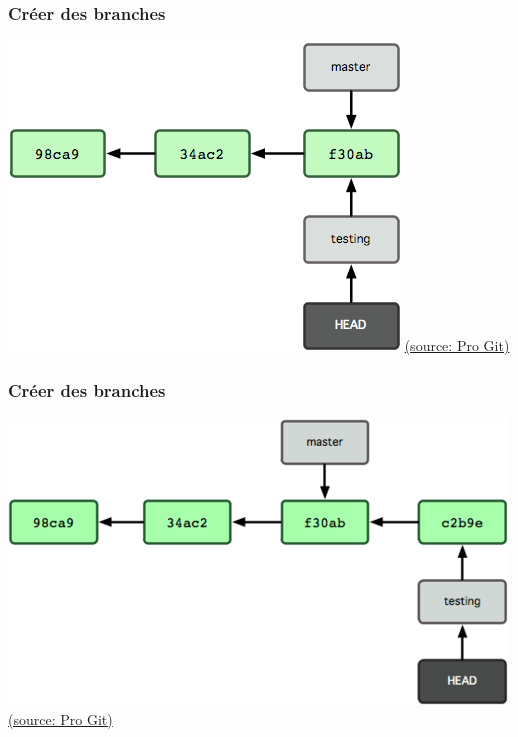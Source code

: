 \documentclass[t,11pt]{beamer}
\begin{document}
\begin{frame}
        \frametitle{Cr\'eer des branches}
        \centering
        \includegraphics[width=\linewidth,height=0.8\textheight,keepaspectratio]{./img/branching_3}
        \newline
        \href{https://git-scm.com/book/fr/v1/Les-branches-avec-Git-Ce-qu-est-une-branche}{{\tiny (source: Pro Git)}}
\end{frame}

\begin{frame}
        \frametitle{Cr\'eer des branches}
        \centering
        \includegraphics[width=\linewidth,height=0.8\textheight,keepaspectratio]{./img/branching_4}
        \newline
        \href{https://git-scm.com/book/fr/v1/Les-branches-avec-Git-Ce-qu-est-une-branche}{{\tiny (source: Pro Git)}}
\end{frame}
\end{document}
